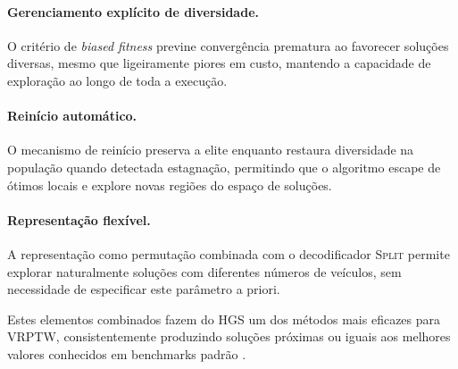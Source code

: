 \paragraph{Gerenciamento explícito de diversidade.} O critério de \emph{biased fitness} previne convergência prematura ao favorecer soluções diversas, mesmo que ligeiramente piores em custo, mantendo a capacidade de exploração ao longo de toda a execução.

\paragraph{Reinício automático.} O mecanismo de reinício preserva a elite enquanto restaura diversidade na população quando detectada estagnação, permitindo que o algoritmo escape de ótimos locais e explore novas regiões do espaço de soluções.

\paragraph{Representação flexível.} A representação como permutação combinada com o decodificador \textsc{Split} permite explorar naturalmente soluções com diferentes números de veículos, sem necessidade de especificar este parâmetro a priori.

Estes elementos combinados fazem do HGS um dos métodos mais eficazes para VRPTW, consistentemente produzindo soluções próximas ou iguais aos melhores valores conhecidos em benchmarks padrão \cite{vidal2013,vidal2014}.
